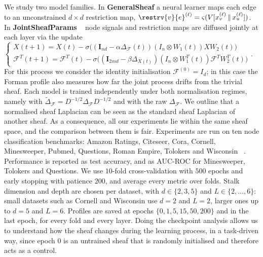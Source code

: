 We study two model families. In \textbf{GeneralSheaf} a neural learner maps each
edge to an unconstrained $d\times d$ restriction map,
$\restrv{v}{e}^{(\ell)} = \varsigma(V[x_v^{(\ell)} \,\|\, x_u^{(\ell)}])$. In
\textbf{JointSheafParams} ~\cite{caralt2024jointdiffusionprocessesinductive} node signals and
restriction maps are diffused jointly at each layer via the update $\begin{cases}
X(t+1) = X(t) - \sigma\big((\mathbf{I}_{nd} - \alpha \Delta_{\mathcal{F}}(t))(I_n \otimes W_1(t))XW_2(t)\big) \\
\mathcal{F}^T(t+1) = \mathcal{F}^T(t) - \sigma\big((\mathbf{I}_{2md} - \beta \Delta_{X(t)})(I_n \otimes W_1^T(t))\mathcal{F}^TW_2^T(t)\big)
\end{cases}$. For this process we consider the
identity initialisation $\mathcal{F}^{(0)} = I_d$; in this case the Forman profile also measures how far the
joint process drifts from the trivial sheaf. 
Each model is trained independently under both
normalisation regimes, namely with
$\widetilde{\Delta}_{\mathcal{F}} = D^{-1/2}\Delta_{\mathcal{F}}D^{-1/2}$ and
with the raw $\Delta_{\mathcal{F}}$.
We outline that a normalised sheaf Laplacian can be seen as the standard sheaf Laplacian of another sheaf.
As a consequence, all our experiments lie within the same sheaf space, and the comparison between them is fair.
Experiments are run on ten node classification benchmarks: Amazon Ratings,
Citeseer, Cora, Cornell, Minesweeper, Pubmed, Questions, Roman Empire, Tolokers
and Wisconsin  ~\cite{sen2008collective,tang2009social,pei2020geomgcn,platonov2023critical}.
Performance is reported as
test accuracy, and as AUC-ROC for Minesweeper, Tolokers and Questions. We use $10$-fold
cross-validation with $500$ epochs and early stopping with patience $200$, and
average every metric over folds.
Stalk dimension and depth are chosen per
dataset, with $d \in \{2,3,5\}$ and $L \in \{2,\dots,6\}$: small datasets such
as Cornell and Wisconsin use $d=2$ and $L=2$, larger ones up to $d=5$ and $L=6$.
Profiles are saved at epochs $\{0,1,5,15,50,200\}$ and in the last
epoch, for every fold and every layer.
Doing the checkpoint analysis allows us to understand how the sheaf changes during the learning process, in a task-driven way, since epoch $0$ is an untrained sheaf that is randomly initialised and therefore acts as a control.

